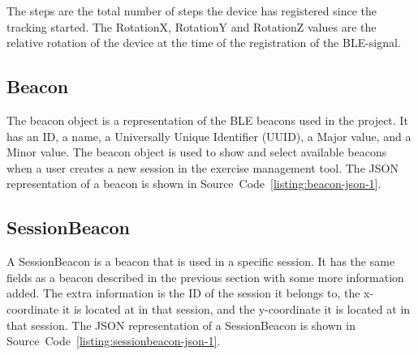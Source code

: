 \documentclass[../Main/thesis.tex]{subfiles}
\begin{document}

The steps are the total number of steps the device has registered since the tracking started. 
The RotationX, RotationY and RotationZ values are the relative rotation of the device at the time of the registration of the BLE-signal.

\subsection{Beacon}
The beacon object is a representation of the BLE beacons used in the project.
It has an ID, a name, a Universally Unique Identifier (UUID), a Major value, and a Minor value.
The beacon object is used to show and select available beacons when a user creates a new session in the exercise management tool.
The JSON representation of a beacon is shown in Source~Code~\ref{listing:beacon-json-1}.


\subsection{SessionBeacon}
A SessionBeacon is a beacon that is used in a specific session.
It has the same fields as a beacon described in the previous section with some more information added.
The extra information is the ID of the session it belongs to, the x-coordinate it is located at in that session, and the y-coordinate it is located at in that session.
The JSON representation of a SessionBeacon is shown in Source~Code~\ref{listing:sessionbeacon-json-1}.
\end{document}
